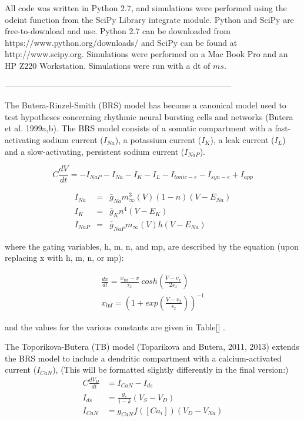 \documentclass{article}
\begin{document}
All code was written in Python 2.7, and simulations were performed using the odeint function from the SciPy Library integrate module. Python and SciPy are free-to-download and use. Python 2.7 can be downloaded from https://www.python.org/downloads/ and SciPy can be found at http://www.scipy.org. Simulations were performed on a Mac Book Pro and an HP Z220 Workstation. Simulations were run with a dt of $ms$.

-----------------------------------------------------------------------------------




The Butera-Rinzel-Smith (BRS) model has become a canonical model used to test hypotheses concerning rhythmic neural bursting cells and networks (Butera et al. 1999a,b). The BRS model consists of a somatic compartment with a fast-activating sodium current ($I_{Na}$), a potassium current ($I_{K}$), a leak current ($I_{L}$) and a slow-activating, persistent sodium current ($I_{NaP}$).

\begin{equation}
C\frac{dV}{dt} = -I_{NaP}-I_{Na}-I_{K}-I_{L}-I_{tonic-e}-I_{syn-e}+I_{app}
\end{equation}

\begin{eqnarray}
I_{Na} &=& \bar{g}_{Na}m^3_{\infty}(V)(1 - n)(V - E_{Na})\\
I_{K} &=& \bar{g}_{K}n^4(V - E_{K})\\
I_{NaP} &=& \bar{g}_{NaP}m_{\infty}(V)h(V - E_{Na})
\end{eqnarray}

where the gating variables, h, m, n, and mp, are described by the equation (upon replacing x with h, m, n, or mp):

\begin{align}
\frac{dx}{dt} = \frac{x_{\inf} - x}{\overline{\tau_{x}}}\ cosh\left( \frac{V - v_{x}}{2s_{x}} \right) \\
x_{\inf} = \left(1 + exp\left(\frac{V - v_{x}}{s_{x}}\right)\right)^{-1}
\end{align}

and the values for the various constants are given in Table[] .


The Toporikova-Butera (TB) model (Toparikova and Butera, 2011, 2013) extends the BRS model to include a dendritic compartment with a calcium-activated current ($I_{CaN}$),
(This will be formatted slightly differently in the final version:)
\begin{align}
C\frac{dV_{D}}{dt} &= I_{CaN} - I_{ds}\\
I_{ds} &= \frac{g_{c}}{1-k}(V_{S} -V_{D})\\
I_{CaN} &= g_{CaN}f([Ca_{i}])(V_{D} - V_{Na})
\end{align}
\end{document}
